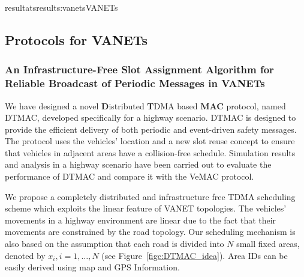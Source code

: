 \documentclass{ra2016}
\begin{document}
\begin{module}{resultats}{results:vanets}{VANETs}

\subsection{Protocols for VANETs}

\begin{participants}
\end{participants}

\subsubsection{An Infrastructure-Free Slot Assignment Algorithm for Reliable Broadcast of Periodic Messages in VANETs}\label{ch:DTMAC}

We have designed a novel \textbf{D}istributed \textbf{T}DMA based \textbf{MAC} protocol, named DTMAC, developed specifically for a highway scenario. DTMAC is designed 
to provide the efficient delivery of both periodic and event-driven safety messages. The protocol uses the vehicles' location and a new slot 
reuse concept to ensure that vehicles in adjacent areas have a collision-free schedule. Simulation results and analysis in a highway 
scenario have been carried out to evaluate the performance of DTMAC and compare it with the VeMAC protocol.

We propose a completely distributed and infrastructure free TDMA scheduling scheme which exploits the linear feature of VANET 
topologies. The vehicles' movements in a highway environment are linear due to the fact that their movements are constrained 
by the road topology. Our scheduling mechanism is also based on the assumption that each road is divided into $N$ small fixed 
areas, denoted by $x_i, i=1,\ldots,N$ (see Figure~\ref{figc:DTMAC_idea}). Area IDs can be easily derived using map and GPS 
Information.


\end{module}
\end{document}
